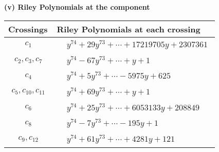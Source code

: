 \documentclass[1p]{elsarticle_modified}
\theoremstyle{definition}
\begin{document}
\newpage\renewcommand{\arraystretch}{1}
\flushleft \textbf{(v) Riley Polynomials at the component}\newline \\
\begin{tabular}{m{50pt}|m{274pt}}
Crossings & \hspace{64pt}Riley Polynomials at each crossing \\
\hline $$\begin{aligned}c_{1}\end{aligned}$$&$\begin{aligned}
&y^{74}+29 y^{73}+\cdots+17219705 y+2307361
\end{aligned}$\\
\hline $$\begin{aligned}c_{2},c_{3},c_{7}\end{aligned}$$&$\begin{aligned}
&y^{74}-67 y^{73}+\cdots+y+1
\end{aligned}$\\
\hline $$\begin{aligned}c_{4}\end{aligned}$$&$\begin{aligned}
&y^{74}+5 y^{73}+\cdots-5975 y+625
\end{aligned}$\\
\hline $$\begin{aligned}c_{5},c_{10},c_{11}\end{aligned}$$&$\begin{aligned}
&y^{74}+69 y^{73}+\cdots+y+1
\end{aligned}$\\
\hline $$\begin{aligned}c_{6}\end{aligned}$$&$\begin{aligned}
&y^{74}+25 y^{73}+\cdots+6053133 y+208849
\end{aligned}$\\
\hline $$\begin{aligned}c_{8}\end{aligned}$$&$\begin{aligned}
&y^{74}-7 y^{73}+\cdots-195 y+1
\end{aligned}$\\
\hline $$\begin{aligned}c_{9},c_{12}\end{aligned}$$&$\begin{aligned}
&y^{74}+61 y^{73}+\cdots+4281 y+121
\end{aligned}$\\
\hline
\end{tabular}\\~\\
\end{document}

